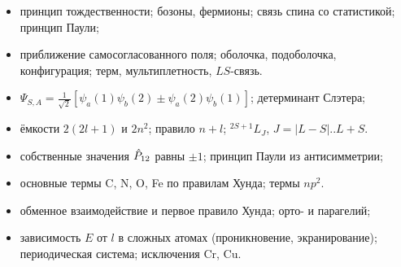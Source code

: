 \begin{examcheck}
\begin{itemize}
 \item принцип тождественности; бозоны, фермионы; связь спина со статистикой; принцип Паули;
 \item приближение самосогласованного поля; оболочка, подоболочка, конфигурация; терм, мультиплетность, $LS$-связь.
\end{itemize}
\begin{itemize}
 \item $\Psi_{S,A}=\frac{1}{\sqrt2}[\psi_a(1)\psi_b(2)\pm\psi_a(2)\psi_b(1)]$; детерминант Слэтера;
 \item ёмкости $2(2l+1)$ и $2n^2$; правило $n+l$; $^{2S+1}L_J$, $J=|L-S|..L+S$.
\end{itemize}
\begin{itemize}
 \item собственные значения $\hat{P}_{12}$ равны $\pm1$; принцип Паули из антисимметрии;
 \item основные термы C, N, O, Fe по правилам Хунда; термы $np^2$.
\end{itemize}
\begin{itemize}
 \item обменное взаимодействие и первое правило Хунда; орто- и парагелий;
 \item зависимость $E$ от $l$ в сложных атомах (проникновение, экранирование); периодическая система; исключения Cr, Cu.
\end{itemize}
\end{examcheck}
